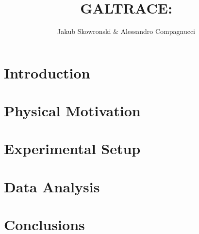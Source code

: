 \documentclass[a4paper, 11pt]{article}
\author{Jakub Skowronski \& Alessandro Compagnucci}
\title{GALTRACE: }
\begin{document}
\maketitle

\clearpage

\tableofcontents

\clearpage

\section{Introduction}



\clearpage

\section{Physical Motivation}



\clearpage

\section{Experimental Setup}



\clearpage

\section{Data Analysis}





\clearpage

\section{Conclusions}



\clearpage


\end{document}
